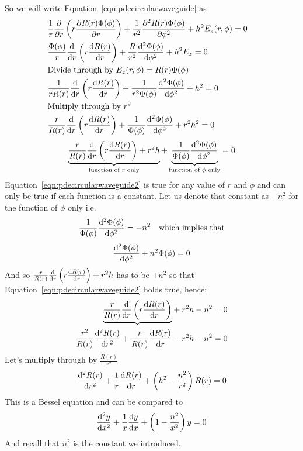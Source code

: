 So we will write Equation~\ref{eqn:pdecircularwaveguide} as 
\begin{align*}
&\frac{1}{r}\partialderivative{}{r}\left(r\partialderivative{R(r)\Phi(\phi)}{r}\right) + \frac{1}{r^2}\partialderivative[2]{R(r)\Phi(\phi)}{\phi} + h^2E_z(r,\phi) = 0\\
&\frac{\Phi(\phi)}{r}\derivative{}{r}\left(r\derivative{R(r)}{r}\right) + \frac{R}{r^2}\derivative[2]{\Phi(\phi)}{\phi} + h^2 E_z = 0\\
&\text{Divide through by }E_z(r,\phi)=R(r)\Phi(\phi)&\\
&\frac{1}{rR(r)}\derivative{}{r}\left(r\derivative{R(r)}{r}\right) + \frac{1}{r^2\Phi(\phi)}\derivative[2]{\Phi(\phi)}{\phi} + h^2 = 0\\
&\text{Multiply through by }r^2\\
&\frac{r}{R(r)}\derivative{}{r}\left(r\derivative{R(r)}{r}\right) + \frac{1}{\Phi(\phi)}\derivative[2]{\Phi(\phi)}{\phi} + r^2h^2 = 0
\end{align*}
\begin{dmath}
\underbrace{\frac{r}{R(r)}\derivative{}{r}\left(r\derivative{R(r)}{r}\right) + r^2 h}_{\text{function of }r\text{ only}} 
+ \underbrace{\frac{1}{\Phi(\phi)}\derivative[2]{\Phi(\phi)}{\phi}}_{\text{function of }\phi\text{ only}} = 0 
\label{eqn:pdecircularwaveguide2} 
\end{dmath}
Equation~\eqref{eqn:pdecircularwaveguide2} is true for any value of $r$ and $\phi$ and can only be true if each function is a constant. Let us denote that constant as $-n^2$ for the function of $\phi$ only i.e. 
\begin{align*}
\frac{1}{\Phi(\phi)}\derivative[2]{\Phi(\phi)}{\phi}=-n^2\quad\text{which implies that}
\end{align*}
\begin{equation}
\derivative[2]{\Phi(\phi)}{\phi} + n^2\Phi(\phi) = 0
\label{eqn:pdecircularwaveguide3}
\end{equation}
And so $\frac{r}{R(r)}\derivative{}{r}\left(r\derivative{R(r)}{r}\right) + r^2 h$ has to be $+n^2$ so that Equation~\eqref{eqn:pdecircularwaveguide2} holds true, hence;
\begin{align*}
\underbrace{\frac{r}{R(r)}\derivative{}{r}\left(r\derivative{R(r)}{r}\right)}& + r^2h - n^2 = 0\\
\frac{r^2}{R(r)}\derivative[2]{R(r)}{r} + \frac{r}{R(r)}\derivative{R(r)}{r}& - r^2h-n^2=0
\end{align*}
Let's multiply through by $\frac{R(r)}{r^2}$
\begin{equation}
\derivative[2]{R(r)}{r}+\frac{1}{r}\derivative{R(r)}{r} + \left(h^2-\frac{n^2}{r^2}\right)R(r)=0
\label{eqn:pdecircularwaveguide4}
\end{equation}
This is a Bessel equation and can be compared to 
\begin{align*}
\derivative[2]{y}{x}+\frac{1}{x}\derivative{y}{x}+\left(1-\frac{n^2}{x^2}\right)y = 0
\end{align*}
And recall that $n^2$ is the constant we introduced.


